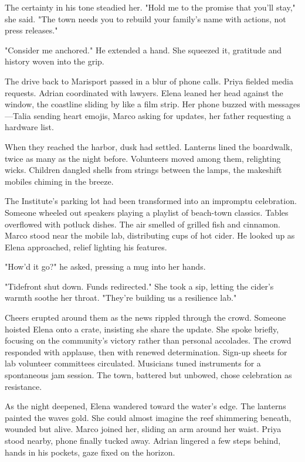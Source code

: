 The certainty in his tone steadied her. "Hold me to the promise that you'll stay," she said. "The town needs you to rebuild your family's name with actions, not press releases."

"Consider me anchored." He extended a hand. She squeezed it, gratitude and history woven into the grip.

The drive back to Marisport passed in a blur of phone calls. Priya fielded media requests. Adrian coordinated with lawyers. Elena leaned her head against the window, the coastline sliding by like a film strip. Her phone buzzed with messages—Talia sending heart emojis, Marco asking for updates, her father requesting a hardware list.

When they reached the harbor, dusk had settled. Lanterns lined the boardwalk, twice as many as the night before. Volunteers moved among them, relighting wicks. Children dangled shells from strings between the lamps, the makeshift mobiles chiming in the breeze.

The Institute's parking lot had been transformed into an impromptu celebration. Someone wheeled out speakers playing a playlist of beach-town classics. Tables overflowed with potluck dishes. The air smelled of grilled fish and cinnamon. Marco stood near the mobile lab, distributing cups of hot cider. He looked up as Elena approached, relief lighting his features.

"How'd it go?" he asked, pressing a mug into her hands.

"Tidefront shut down. Funds redirected." She took a sip, letting the cider's warmth soothe her throat. "They're building us a resilience lab."

Cheers erupted around them as the news rippled through the crowd. Someone hoisted Elena onto a crate, insisting she share the update. She spoke briefly, focusing on the community's victory rather than personal accolades. The crowd responded with applause, then with renewed determination. Sign-up sheets for lab volunteer committees circulated. Musicians tuned instruments for a spontaneous jam session. The town, battered but unbowed, chose celebration as resistance.

As the night deepened, Elena wandered toward the water's edge. The lanterns painted the waves gold. She could almost imagine the reef shimmering beneath, wounded but alive. Marco joined her, sliding an arm around her waist. Priya stood nearby, phone finally tucked away. Adrian lingered a few steps behind, hands in his pockets, gaze fixed on the horizon.

